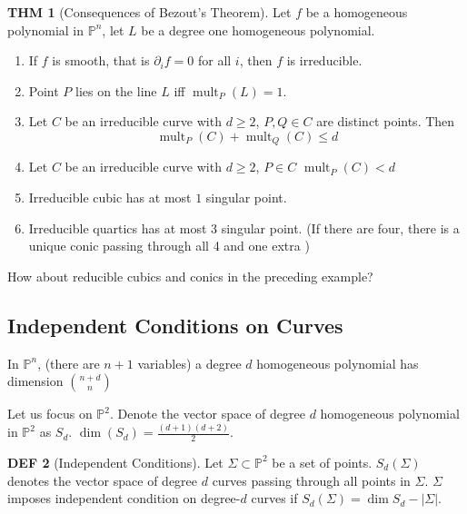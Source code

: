 \documentclass[twocolumn]{article}
\newcommand{\p}{\partial}
\DeclareMathOperator{\mult}{mult}
\renewcommand{\P}{\mathbb{P}}
\theoremstyle{definition}
\newtheorem{thm}{THM}
\newtheorem{defi}[thm]{DEF}
\theoremstyle{remark}
\begin{document}
\begin{thm}[Consequences of Bezout's Theorem]
	Let $f$ be a homogeneous polynomial in $\P^n$, let $L$ be a degree one homogeneous polynomial.
	\begin{enumerate}
		\item If $f$ is smooth, that is $\p_i f = 0$ for all $i$, then $f$ is irreducible.
		\item Point $P$ lies on the line $L$ iff $\mult_P(L) = 1$.
		\item Let $C$ be an irreducible curve with $d \geq 2$, $P, Q \in C$ are distinct points. Then 
			$$\mult_P(C) + \mult_Q(C) \leq d$$
		\item Let $C$ be an irreducible curve with $d \geq 2$, $P \in C$
			$\mult_P(C)  < d$
		\item Irreducible cubic has at most $1$ singular point.
		\item Irreducible quartics has at most $3$ singular point. (If there are four, there is a unique conic passing through all 4 and one extra )
	\end{enumerate}
\end{thm}

\begin{toverify}{}
	How about reducible cubics and conics in the preceding example?
\end{toverify}

\subsection{Independent Conditions on Curves}

In $\P^n$, (there are $n+1$ variables) a degree $d$ homogeneous polynomial has dimension
$\binom{n+d}{n}$ 

Let us focus on $\P^2$. 
Denote the vector space of degree $d$ homogeneous polynomial in $\P^2$ as $S_d$. $\dim(S_d) = \frac{(d+1)(d+2)}{2}$.

\begin{defi}[Independent Conditions]
	Let $\Sigma \subset \P^2$ be a set of points. 
	$S_d(\Sigma)$ denotes the vector space of degree $d$ curves passing through all points in $\Sigma$.
	$\Sigma$ imposes independent condition on degree-$d$ curves if $S_d(\Sigma) = \dim{S_d} - |\Sigma|$.
\end{defi}
\end{document}
